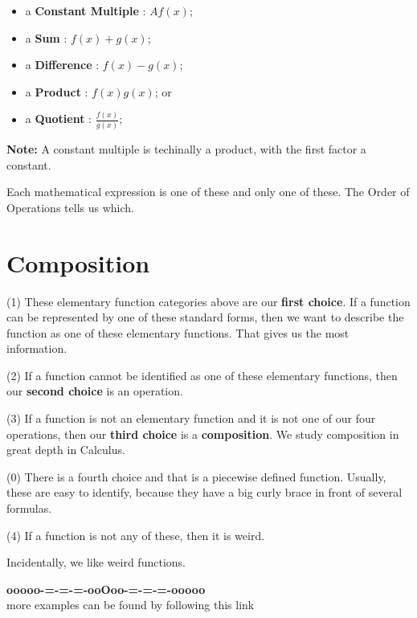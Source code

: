 \documentclass{ximera}
\begin{document}
\begin{itemize}
	\item a \textbf{Constant Multiple} : $A f(x)$;
	\item a \textbf{Sum} : $f(x) + g(x)$;
	\item a \textbf{Difference} : $f(x) - g(x)$;
	\item a \textbf{Product} : $f(x) g(x)$; or 
	\item a \textbf{Quotient} : $\frac{f(x)}{g(x)}$;
\end{itemize}

\textbf{Note:} A constant multiple is techinally a product, with the first factor a constant.

Each mathematical expression is one of these and only one of these.  The Order of Operations tells us which.













\section*{Composition}


(1) These elementary function categories above are our \textbf{first choice}.  If a function can be represented by one of these standard forms, then we want to describe the function as one of these elementary functions.  That gives us the most information. 


(2) If a function cannot be identified as one of these elementary functions, then our \textbf{second choice} is an operation. 


(3) If a function is not an elementary function and it is not one of our four operations, then our \textbf{third choice} is a \textbf{\textcolor{purple!85!blue}{composition}}.  We study composition in great depth in Calculus. 

(0) There is a fourth choice and that is a piecewise defined function.  Usually, these are easy to identify, because they have a big curly brace in front of several formulas. 

(4) If a function is not any of these, then it is weird.

Incidentally, we like weird functions.


























\begin{center}
\textbf{\textcolor{green!50!black}{ooooo-=-=-=-ooOoo-=-=-=-ooooo}} \\

more examples can be found by following this link\\ 

\end{center}
\end{document}

